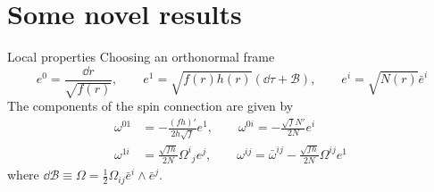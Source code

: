\documentclass[aspectratio=169,xcolor=dvipsnames]{beamer}
\begin{document}
\section{Some novel results}
\begin{frame}{Local properties}\justifying
Choosing an orthonormal frame
    \begin{equation*}
    e^0=\frac{\dd r}{\sqrt{f(r)}},\qquad e^1=\sqrt{f(r)h(r)}(\dd\tau+\mathcal{B}),\qquad e^{i}=\sqrt{N(r)}\bar{e}^{i}
\end{equation*}
The components of the spin connection are given by
\begin{align*}
    \omega^{01}&=-\frac{(fh)'}{2h\sqrt{f}}e^1,\qquad 
    \omega^{0i}=-\frac{\sqrt{f}N'}{2N}e^{i}\\
    \omega^{1i}&=\frac{\sqrt{fh}}{2N}\Omega^{i}{}_je^j,\qquad 
    \omega^{ij}=\bar{\omega}^{ij}-\frac{\sqrt{fh}}{2N}\Omega^{ij}e^1\
\end{align*}
where $\dd \mathcal{B}\equiv \Omega=\frac{1}{2}\Omega_{ij}\bar{e}^{i}\wedge \bar{e}^j$. 
\end{frame}
\end{document}
